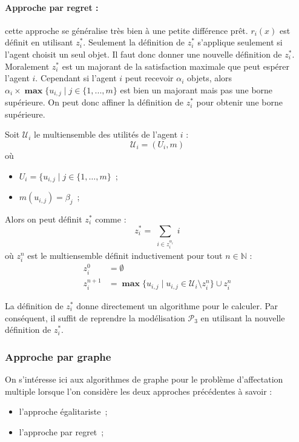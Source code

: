 \documentclass[a4paper, titlepage, oneside, 12pt]{article}%
\newcommand\boldmax{\mathop{\mathbf{max}}}
\begin{document}
\paragraph{Approche par regret : } cette approche se généralise très bien à une petite différence prêt. $r_i(x)$ est définit en utilisant $z_i^*$. Seulement la définition de $z_i^*$ s'applique seulement si l'agent choisit un seul objet. Il faut donc donner une nouvelle définition de $z_i^*$. Moralement $z_i^*$ est un majorant de la satisfaction maximale que peut espérer l'agent $i$. Cependant si l'agent $i$ peut recevoir $\alpha_i$ objets, alors $\alpha_i \times \boldmax \{u_{i,j} \mid j\in \{1,..., m\}$ est bien un majorant mais pas une borne supérieure. On peut donc affiner la définition de $z_i^*$ pour obtenir une borne supérieure. 

Soit $\mathcal{U}_i$ le multiensemble des utilités de l'agent $i$ : 
$$\mathcal{U}_i=(U_i,m)$$ où 
\begin{itemize}
\item $U_i=\{u_{i,j} \mid j \in \{1,\dots,m\}$~;
\item $m(u_{i,j})=\beta_j$~;
\end{itemize}

Alors on peut définit $z_i^*$ comme :
$$z_i^*=\sum_{\substack{i \in z_i^{\alpha_i}}} i$$ 
où $z_i^{n}$ est le multiensemble définit inductivement pour tout $n\in \mathbb{N}$ : 
\begin{align*}
z_i^0 &= \emptyset \\
z_i^{n+1} &= \boldmax \{u_{i,j} \mid u_{i,j} \in \mathcal{U}_i \setminus z_i^{n} \} \cup z_i^{n} 
\end{align*} 

La définition de $z_i^*$ donne directement un algorithme pour le calculer. Par conséquent, il suffit de reprendre la modélisation $\mathcal{P}_3$ en utilisant la nouvelle définition de $z_i^*$.

\subsubsection{Approche par graphe}

On s'intéresse ici aux algorithmes de graphe pour le problème d'affectation multiple lorsque l'on considère les deux approches précédentes à savoir :
\begin{itemize}
\item l'approche égalitariste~;
\item l'approche par regret~;
\end{itemize}
\end{document}
